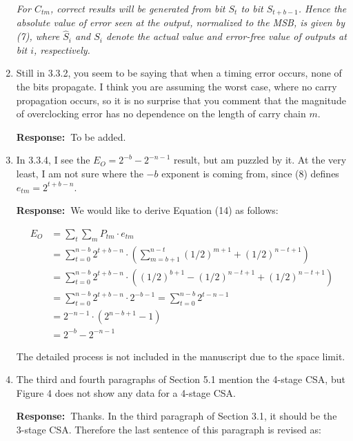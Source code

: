 \documentclass[a4paper, 11pt]{article}
\def\Response{\noindent \textbf{Response:~}}
\newcommand{\Question}[1]{\textcolor[rgb]{0.51,0.00,0.00}{#1}}
\newcommand{\PaperText}[1]{\emph{#1}}
\begin{document}
\begin{enumerate}
      \PaperText{For $C_{tm}$, correct results will be generated from bit $S_t$ to bit $S_{t+b-1}$. Hence the absolute value of error seen at the output, normalized to the MSB, is given by (7), where $\hat{S}_i$ and $S_i$ denote the actual value and error-free value of outputs at bit $i$, respectively.}\\
      
  \item \Question{Still in 3.3.2, you seem to be saying that when a timing error occurs, none of the bits propagate. I think you are assuming the worst case, where no carry propagation occurs, so it is no surprise that you comment that the magnitude of overclocking error has no dependence on the length of carry chain $m$.}
      
      \Response To be added.
      
  \item \Question{In 3.3.4, I see the $E_O = 2^{-b}-2^{-n-1}$ result, but am puzzled by it.  At the very least, I am not sure where the $-b$ exponent is coming from, since (8) defines $e_{tm} = 2^{t+b-n}$.}
      
      \Response We would like to derive Equation (14) as follows:
      
      \begin{align*}
        E_O&=\sum_t\sum_m P_{tm}\cdot e_{tm}\\ &=\sum_{t=0}^{n-b}2^{t+b-n}\cdot\left(\sum_{m=b+1}^{n-t}(1/2)^{m+1}+(1/2)^{n-t+1}\right)\\
        &=\sum_{t=0}^{n-b}2^{t+b-n}\cdot\left((1/2)^{b+1}-(1/2)^{n-t+1}+(1/2)^{n-t+1}\right)\\
        &=\sum_{t=0}^{n-b}2^{t+b-n}\cdot2^{-b-1}=\sum_{t=0}^{n-b}2^{t-n-1}\\
        &=2^{-n-1}\cdot\left(2^{n-b+1}-1\right)\\
        &=2^{-b}-2^{-n-1}
      \end{align*}
      
      The detailed process is not included in the manuscript due to the space limit.
      
  \item \Question{The third and fourth paragraphs of Section 5.1 mention the 4-stage CSA, but Figure 4 does not show any data for a 4-stage CSA.}
      
      \Response Thanks. In the third paragraph of Section 3.1, it should be the 3-stage CSA. Therefore the last sentence of this paragraph is revised as:\\
      

\end{enumerate}
\end{document}

